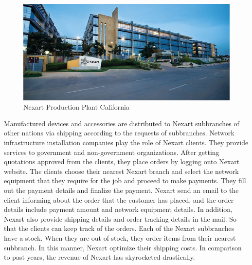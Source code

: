 \documentclass[a4Paper,12pt]{report}
\begin{document}
\begin{figure}[H]
\centering
\includegraphics[scale=0.8]{images/nexart_production_plant.jpg}
\caption{Nexart Production Plant California}
\end{figure}
Manufactured devices and accessories are distributed to Nexart subbranches of other nations via shipping according to the requests of subbranches. Network infrastructure installation companies play the role of Nexart clients. They provide services to government and non-government organizations. After getting quotations approved from the clients, they place orders by logging onto Nexart website. The clients choose their nearest Nexart branch and select the network equipment that they require for the job and proceed to make payments. They fill out the payment details and finalize the payment. Nexart send an email to the client informing about the order that the customer has placed, and the order details include payment amount and network equipment details. In addition, Nexart also provide shipping details and order tracking details in the mail. So that the clients can keep track of the orders. Each of the Nexart subbranches have a stock. When they are out of stock, they order items from their nearest subbranch. In this manner, Nexart optimize their shipping costs. In comparison to past years, the revenue of Nexart has skyrocketed drastically.\\[12pt]
\end{document}

